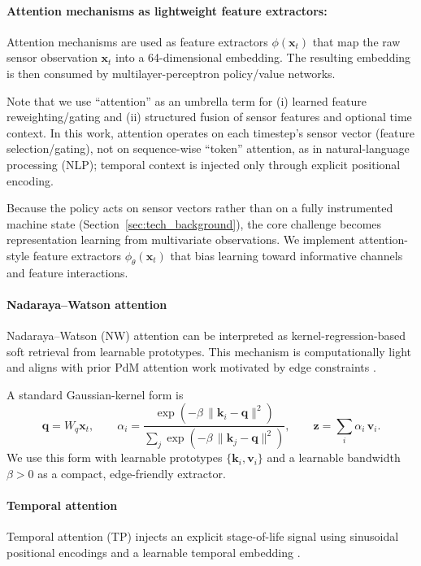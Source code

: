 \documentclass[sn-basic]{sn-jnl} %
\begin{document}
\paragraph{Attention mechanisms as lightweight feature extractors:}
\label{sec:attention}

Attention mechanisms are used as feature extractors $\phi(\mathbf{x}_t)$ that map the raw sensor observation $\mathbf{x}_t$ into a 64-dimensional embedding. The resulting embedding is then consumed by multilayer-perceptron policy/value networks.

Note that we use ``attention'' as an umbrella term for (i) learned feature reweighting/gating and (ii) structured fusion of sensor features and optional time context. In this work, attention operates on each timestep's sensor vector (feature selection/gating), not on sequence-wise ``token'' attention, as in natural-language processing (NLP); temporal context is injected only through explicit positional encoding.

Because the policy acts on sensor vectors rather than on a fully instrumented machine state (Section~\ref{sec:tech_background}), the core challenge becomes representation learning from multivariate observations. We implement attention-style feature extractors $\phi_\theta(\mathbf{x}_t)$ that bias learning toward informative channels and feature interactions.

\paragraph{Nadaraya--Watson attention}
Nadaraya--Watson (NW) attention can be interpreted as kernel-regression-based soft retrieval from learnable prototypes. This mechanism is computationally light and aligns with prior PdM attention work motivated by edge constraints \cite{Siraskar2024}.

A standard Gaussian-kernel form is
\begin{equation}
	\mathbf{q}=W_q\mathbf{x}_t,\qquad
	\alpha_i = \frac{\exp\left(-\beta\,\lVert \mathbf{k}_i-\mathbf{q}\rVert^2\right)}{\sum_j \exp\left(-\beta\,\lVert \mathbf{k}_j-\mathbf{q}\rVert^2\right)},
	\qquad \mathbf{z}=\sum_i\alpha_i\,\mathbf{v}_i.
\end{equation}
We use this form with learnable prototypes $\{\mathbf{k}_i,\mathbf{v}_i\}$ and a learnable bandwidth $\beta>0$ as a compact, edge-friendly extractor.

\paragraph{Temporal attention}
Temporal attention (TP) injects an explicit stage-of-life signal using sinusoidal positional encodings and a learnable temporal embedding \cite{Vaswani2017, Lim2020TFT}.
\end{document}
